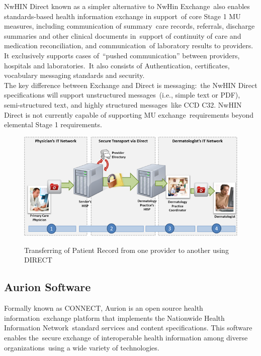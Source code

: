  	NwHIN Direct known as a simpler alternative to NwHin Exchange\
also enables standards-based health information exchange in support\
 of core Stage 1 MU measures, including communication of summary\
care records, referrals, discharge summaries and other clinical documents in\
 support of continuity of care and medication reconciliation, and communication\
 of laboratory results to providers. It exclusively supports cases of\
 “pushed communication” between providers, hospitals and laboratories.\
 It also consists of Authentication, certificates, vocabulary messaging standards and security.\\

The key difference between Exchange and Direct is messaging:\
 the NwHIN Direct specifications will support unstructured messages\
(i.e., simple text or PDF), semi-structured text, and highly structured messages\
 like CCD C32. NwHIN Direct is not currently capable of supporting MU exchange\
requirements beyond elemental Stage 1 requirements.\
\citep{_nwhin_exchange_2013}\

 \begin{figure}[ht!]
    \centering
    \includegraphics[scale=0.5]{nwhin.png}
    \caption{Transferring of Patient Record from one provider to another using DIRECT}
    \cite[Fig.~1]{_nwhin_frameworkOne_2013}
    \label{fig:nwhin}
  \end{figure}  

  \subsection{Aurion Software}

	Formally known as CONNECT, Aurion is an open source health information\
exchange platform that implements the Nationwide Health Information Network\
 standard services and content specifications. This software enables the\
secure exchange of interoperable health information among diverse organizations\
 using a wide variety of technologies.\\

